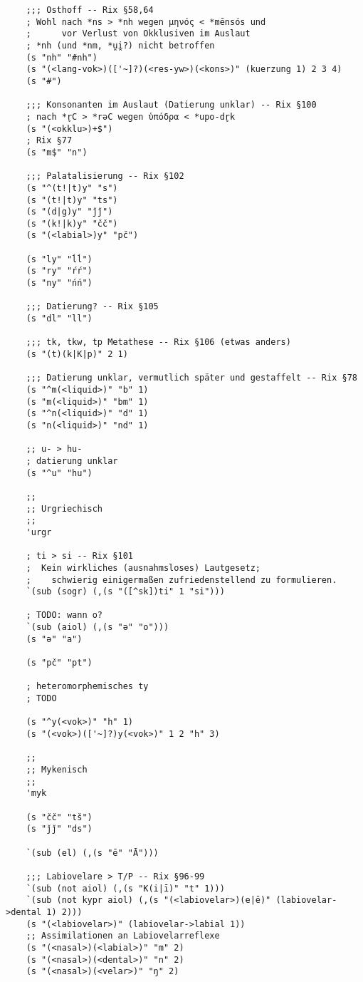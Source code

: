 \begin{verbatim}
    ;;; Osthoff -- Rix §58,64
    ; Wohl nach *ns > *nh wegen μηνός < *mēnsós und
    ;      vor Verlust von Okklusiven im Auslaut
    ; *nh (und *nm, *u̯i̯?) nicht betroffen
    (s "nh" "#nh")
    (s "(<lang-vok>)(['~]?)(<res-yw>)(<kons>)" (kuerzung 1) 2 3 4)
    (s "#")

    ;;; Konsonanten im Auslaut (Datierung unklar) -- Rix §100
    ; nach *r̥C > *rəC wegen ὑπόδρα < *upo-dr̥k
    (s "(<okklu>)+$")
    ; Rix §77
    (s "m$" "n")

    ;;; Palatalisierung -- Rix §102
    (s "^(t!|t)y" "s")
    (s "(t!|t)y" "ts")
    (s "(d|g)y" "ǰǰ")
    (s "(k!|k)y" "čč")
    (s "(<labial>)y" "pč")

    (s "ly" "ĺĺ")
    (s "ry" "ŕŕ")
    (s "ny" "ńń")

    ;;; Datierung? -- Rix §105
    (s "dl" "ll")

    ;;; tk, tkw, tp Metathese -- Rix §106 (etwas anders)
    (s "(t)(k|K|p)" 2 1)

    ;;; Datierung unklar, vermutlich später und gestaffelt -- Rix §78
    (s "^m(<liquid>)" "b" 1)
    (s "m(<liquid>)" "bm" 1)
    (s "^n(<liquid>)" "d" 1)
    (s "n(<liquid>)" "nd" 1)

    ;; u- > hu-
    ; datierung unklar
    (s "^u" "hu")

    ;;
    ;; Urgriechisch
    ;;
    'urgr

    ; ti > si -- Rix §101
    ;  Kein wirkliches (ausnahmsloses) Lautgesetz;
    ;    schwierig einigermaßen zufriedenstellend zu formulieren.
    `(sub (sogr) (,(s "([^sk])ti" 1 "si")))

    ; TODO: wann o?
    `(sub (aiol) (,(s "ə" "o")))
    (s "ə" "a")

    (s "pč" "pt")

    ; heteromorphemisches ty
    ; TODO

    (s "^y(<vok>)" "h" 1)
    (s "(<vok>)(['~]?)y(<vok>)" 1 2 "h" 3)

    ;;
    ;; Mykenisch
    ;;
    'myk

    (s "čč" "tš")
    (s "ǰǰ" "ds")

    `(sub (el) (,(s "ē" "Ā")))

    ;;; Labiovelare > T/P -- Rix §96-99
    `(sub (not aiol) (,(s "K(i|ī)" "t" 1)))
    `(sub (not kypr aiol) (,(s "(<labiovelar>)(e|ē)" (labiovelar->dental 1) 2)))
    (s "(<labiovelar>)" (labiovelar->labial 1))
    ;; Assimilationen an Labiovelarreflexe
    (s "(<nasal>)(<labial>)" "m" 2)
    (s "(<nasal>)(<dental>)" "n" 2)
    (s "(<nasal>)(<velar>)" "ŋ" 2)


\end{verbatim}
